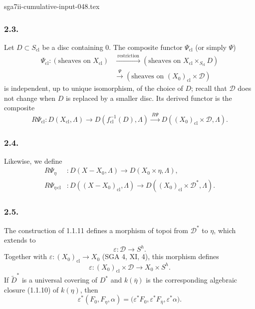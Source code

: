 \begin{filecontents*}{sga7ii-cumulative-input-048.tex}
\subsubsection*{2.3.}
Let $D\subset S_{\mathrm{cl}}$ be a disc containing $0$.  The
composite functor $\Psi_{\mathrm{cl}}$ (or simply $\Psi$)
\[
\begin{aligned}
\Psi_{\mathrm{cl}}:(\text{sheaves on }X_{\mathrm{cl}})
&\xrightarrow{\ \mathrm{restriction}\ }
(\text{sheaves on }X_{\mathrm{cl}}\times_{S_{\mathrm{cl}}}D)\\
&\xrightarrow{\ \Psi\ }
(\text{sheaves on }(X_0)_{\mathrm{cl}}\times\mathcal D)
\end{aligned}
\]
is independent, up to unique isomorphism, of the choice of $D$;
recall that $\mathcal D$ does not change when $D$ is replaced by a
smaller disc.  Its derived functor is the composite
\[
R\Psi_{\mathrm{cl}}:D(X_{\mathrm{cl}},\Lambda)
\longrightarrow D(f_{\mathrm{cl}}^{-1}(D),\Lambda)
\xrightarrow{\ R\Psi\ }
D((X_0)_{\mathrm{cl}}\times\mathcal D,\Lambda).
\]

\subsubsection*{2.4.}
Likewise, we define
\[
\begin{aligned}
R\Psi_\eta &:D(X-X_0,\Lambda)
  \longrightarrow D(X_0\times\eta,\Lambda),\\
R\Psi_{\eta\,\mathrm{cl}} &:D((X-X_0)_{\mathrm{cl}},\Lambda)
  \longrightarrow D((X_0)_{\mathrm{cl}}\times\mathcal D^*,\Lambda).
\end{aligned}
\]

\subsubsection*{2.5.}
The construction of 1.1.11 defines a morphism of topoi from
$\mathcal D^*$ to $\eta$, which extends to
\[
\varepsilon:\mathcal D\longrightarrow S^h.
\]
Together with
$\varepsilon:(X_0)_{\mathrm{cl}}\longrightarrow X_0$ (SGA 4, XI,
4), this morphism defines
\[
\varepsilon:(X_0)_{\mathrm{cl}}\times\mathcal D
\longrightarrow X_0\times S^h.
\]
If $\widetilde D^*$ is a universal covering of $D^*$ and
$k(\bar\eta)$ is the corresponding algebraic closure (1.1.10) of
$k(\eta)$, then
\[
\varepsilon^*(F_0,F_\eta,\alpha)
=\bigl(\varepsilon^*F_0,\varepsilon^*F_{\bar\eta},
\varepsilon^*\alpha\bigr).
\]

\end{filecontents*}
